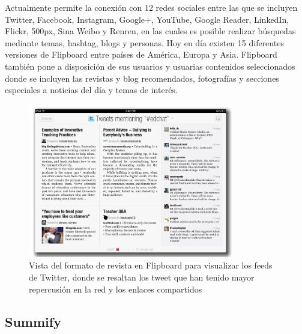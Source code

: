 
Actualmente permite la conexión con 12 redes sociales entre las que se incluyen Twitter, Facebook, Instagram, Google+, YouTube, Google Reader, LinkedIn, Flickr, 500px, Sina Weibo y Renren, en las cuales es posible realizar búsquedas mediante temas, hashtag, blogs y personas. Hoy en día existen 15 diferentes versiones de Flipboard entre países de América, Europa y Asia. Flipboard también pone a disposición de sus usuarios y usuarias contenidos seleccionados donde se incluyen las revistas y blog recomendados, fotografías y secciones especiales a noticias del día y temas de interés.

\begin{figure}[H]
	\centering
	\includegraphics[width=0.8\textwidth]{imgs/flipboard3.PNG}
	\caption{Vista del formato de revista en Flipboard para visualizar los feeds de Twitter, donde se resaltan los tweet que han tenido mayor repercusión en la red y los enlaces compartidos}
	\label{fig:flipboard1}
\end{figure}

\subsection{Summify}

